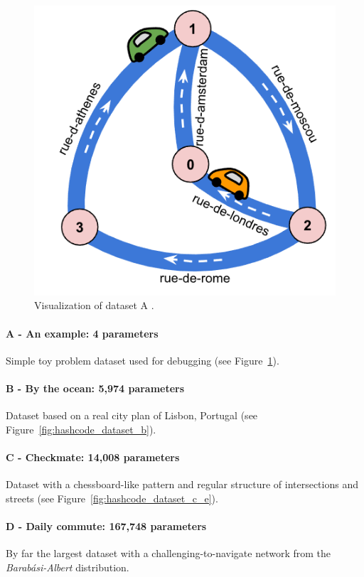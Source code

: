 \begin{figure}[h]
    \centering
    \includegraphics[width=.5\linewidth]{img/hashcode/figure5.png}
    \caption[Visualization of dataset A]{
        Visualization of dataset A \cite{google2023google}.
    }
    \label{fig:hashcode_dataset_a}
\end{figure}

\paragraph{A - An example: 4 parameters} Simple toy problem dataset used for debugging (see Figure~\ref{fig:hashcode_dataset_a}).

\paragraph{B - By the ocean: 5,974 parameters} Dataset based on a real city plan of Lisbon, Portugal (see Figure~\ref{fig:hashcode_dataset_b}).

\paragraph{C - Checkmate: 14,008 parameters} Dataset with a chessboard-like pattern and regular structure of intersections and streets (see Figure~\ref{fig:hashcode_dataset_c_e}).

\paragraph{D - Daily commute: 167,748 parameters} By far the largest dataset with a challenging-to-navigate network from the \textit{Barabási-Albert} \cite{albert2002statistical} distribution.

